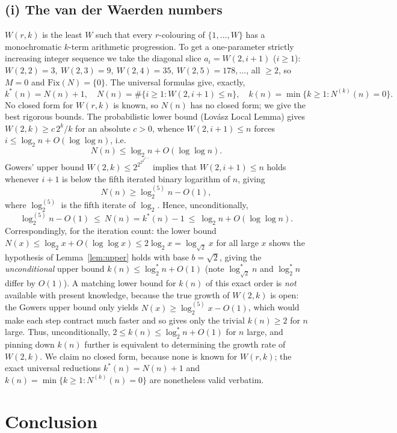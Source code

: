 \documentclass[12pt]{article}
\theoremstyle{definition}
\begin{document}
\subsection{(i) The van der Waerden numbers}
$W(r,k)$ is the least $W$ such that every $r$-colouring of $\{1,\dots,W\}$ has a
monochromatic $k$-term arithmetic progression. To get a one-parameter strictly
increasing integer sequence we take the diagonal slice $a_i=W(2,i+1)$ ($i\ge1$):
$W(2,2)=3,\ W(2,3)=9,\ W(2,4)=35,\ W(2,5)=178,\dots$, all $\ge2$, so $M=0$ and
$\mathrm{Fix}(N)=\{0\}$. The universal formulas give, exactly,
\[
  k^*(n)=N(n)+1,\quad N(n)=\#\{i\ge1:W(2,i+1)\le n\},\quad
  k(n)=\min\{k\ge1:N^{(k)}(n)=0\}.
\]
No closed form for $W(r,k)$ is known, so $N(n)$ has no closed form; we give the best
rigorous bounds. The probabilistic lower bound (Lovász Local Lemma) gives
$W(2,k)\ge c\,2^{k}/k$ for an absolute $c>0$, whence $W(2,i+1)\le n$ forces
$i\le\log_2 n+O(\log\log n)$, i.e.
\[
  N(n)\le\log_2 n+O(\log\log n).
\]
Gowers' upper bound $W(2,k)\le 2^{2^{2^{2^{2^{\,k+9}}}}}$ implies that $W(2,i+1)\le n$
holds whenever $i+1$ is below the fifth iterated binary logarithm of $n$, giving
\[
  N(n)\ge\log^{(5)}_2 n-O(1),
\]
where $\log^{(5)}_2$ is the fifth iterate of $\log_2$. Hence, unconditionally,
\[
  \log^{(5)}_2 n-O(1)\ \le\ N(n)=k^*(n)-1\ \le\ \log_2 n+O(\log\log n).
\]
Correspondingly, for the iteration count: the lower bound
$N(x)\le\log_2 x+O(\log\log x)\le 2\log_2 x=\log_{\sqrt2}x$ for all large $x$ shows the
hypothesis of Lemma~\ref{lem:upper} holds with base $b=\sqrt2$, giving the
\emph{unconditional} upper bound $k(n)\le\log^*_2 n+O(1)$ (note $\log^*_{\sqrt2}n$ and
$\log^*_2 n$ differ by $O(1)$). A matching lower bound for $k(n)$ of this exact order
is \emph{not} available with present knowledge, because the true growth of $W(2,k)$ is
open: the Gowers upper bound only yields $N(x)\ge\log^{(5)}_2 x-O(1)$, which would make
each step contract much faster and so gives only the trivial $k(n)\ge2$ for $n$ large.
Thus, unconditionally, $2\le k(n)\le \log^*_2 n+O(1)$ for $n$ large, and pinning down
$k(n)$ further is equivalent to determining the growth rate of $W(2,k)$. We claim no closed form, because none is
known for $W(r,k)$; the exact universal reductions $k^*(n)=N(n)+1$ and
$k(n)=\min\{k\ge1:N^{(k)}(n)=0\}$ are nonetheless valid verbatim.

\section{Conclusion}
\end{document}
